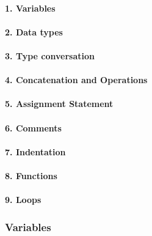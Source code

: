 \documentclass[11pt]{article}
\begin{document}
\hypertarget{variables}{%
\paragraph{1. Variables}\label{variables}}

\hypertarget{data-types}{%
\paragraph{2. Data types}\label{data-types}}

\hypertarget{type-conversation}{%
\paragraph{3. Type conversation}\label{type-conversation}}

\hypertarget{concatenation-and-operations}{%
\paragraph{4. Concatenation and
Operations}\label{concatenation-and-operations}}

\hypertarget{assignment-statement}{%
\paragraph{5. Assignment Statement}\label{assignment-statement}}

\hypertarget{comments}{%
\paragraph{6. Comments}\label{comments}}

\hypertarget{indentation}{%
\paragraph{7. Indentation}\label{indentation}}

\hypertarget{functions}{%
\paragraph{8. Functions}\label{functions}}

\hypertarget{loops}{%
\paragraph{9. Loops}\label{loops}}

    \hypertarget{variables}{%
\subsubsection{Variables}\label{variables}}
\end{document}
